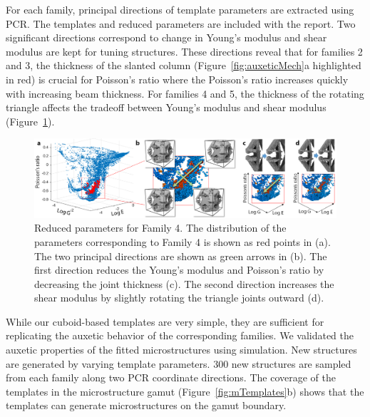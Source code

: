 For each family, principal directions of template parameters are extracted using PCR. The templates and reduced parameters are included with the report. Two significant directions correspond to change in Young's modulus and shear modulus are kept for tuning structures. These directions reveal that for families 2 and 3, the thickness of the slanted column (Figure~\ref{fig:auxeticMech}a highlighted in red) is crucial for Poisson's ratio where the Poisson's ratio increases quickly with increasing beam thickness.
For families 4 and 5, the thickness of the rotating triangle affects the tradeoff between Young's modulus and shear modulus (Figure~\ref{fig:paramReduction}).
\begin{figure}
	\includegraphics[width=\columnwidth]{images/paramReduction.png}
	\caption{Reduced parameters for Family 4. The distribution of the parameters corresponding to Family 4 is shown as red points in (a). The two principal directions are shown as green arrows in (b). The first direction reduces the Young's modulus and Poisson's ratio by decreasing the joint thickness (c). The second direction increases the shear modulus by slightly rotating the triangle joints outward (d).}
	\label{fig:paramReduction}
\end{figure}
While our cuboid-based templates are very simple, they are sufficient for replicating the auxetic behavior of the corresponding families.
We validated the auxetic properties of the fitted microstructures using simulation.
New structures are generated by varying template parameters.
300 new structures are sampled from each family along two PCR coordinate directions.
The coverage of the templates in the microstructure gamut (Figure~\ref{fig:mTemplates}b) shows that the templates can generate microstructures on the gamut boundary.

